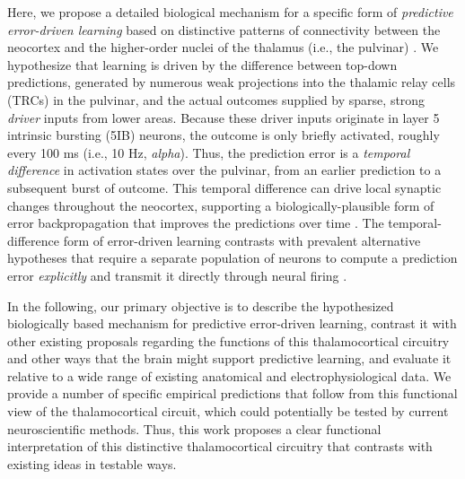 \documentclass[11pt,twoside]{article}
\newif\myifpdf
\begin{document}
Here, we propose a detailed biological mechanism for a specific form of \emph{predictive error-driven learning} based on distinctive patterns of connectivity between the neocortex and the higher-order nuclei of the thalamus (i.e., the pulvinar) \citep{ShermanGuillery06,UsreySherman18}.  We hypothesize that learning is driven by the difference between top-down predictions, generated by numerous weak projections into the thalamic relay cells (TRCs) in the pulvinar, and the actual outcomes supplied by sparse, strong \emph{driver} inputs from lower areas.  Because these driver inputs originate in layer 5 intrinsic bursting (5IB) neurons, the outcome is only briefly activated, roughly every 100 ms (i.e., 10 Hz, \emph{alpha}).  Thus, the prediction error is a \emph{temporal difference} in activation states over the pulvinar, from an earlier prediction to a subsequent burst of outcome.  This temporal difference can drive local synaptic changes throughout the neocortex, supporting a biologically-plausible form of error backpropagation that improves the predictions over time \citep{OReilly96,AckleyHintonSejnowski85,HintonMcClelland88,BengioMesnardFischerEtAl17,WhittingtonBogacz19,LillicrapSantoroMarrisEtAl20}.
The temporal-difference form of error-driven learning contrasts with prevalent alternative hypotheses that require a separate population of neurons to compute a prediction error \emph{explicitly} and transmit it directly through neural firing \citep{RaoBallard99,KawatoHayakawaInui93,Friston05,Friston10,OudenKokLange12,LotterKreimanCox16}.

In the following, our primary objective is to describe the hypothesized biologically based mechanism for predictive error-driven learning, contrast it with other existing proposals regarding the functions of this thalamocortical circuitry and other ways that the brain might support predictive learning, and evaluate it relative to a wide range of existing anatomical and electrophysiological data.  We provide a number of specific empirical predictions that follow from this functional view of the thalamocortical circuit, which could potentially be tested by current neuroscientific methods.  Thus, this work proposes a clear functional interpretation of this distinctive thalamocortical circuitry that contrasts with existing ideas in testable ways.
\end{document}
